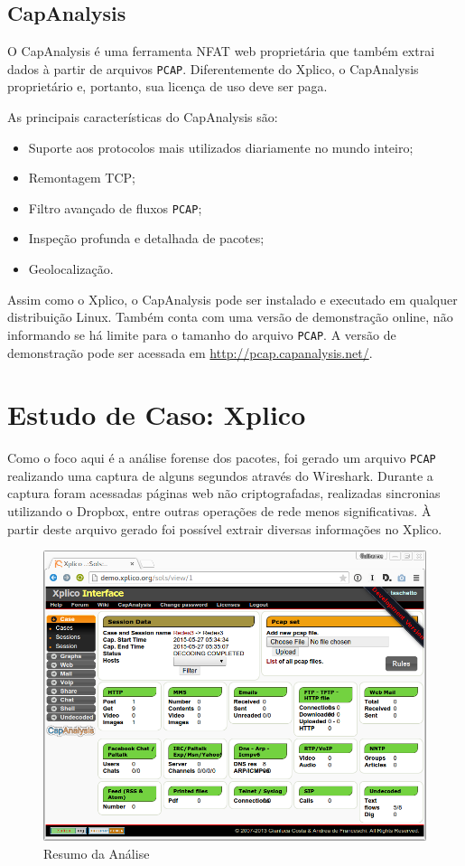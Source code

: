 \documentclass[12pt]{article}
\begin{document}
\subsection{CapAnalysis}

O CapAnalysis é uma ferramenta NFAT web proprietária que também extrai dados à partir de arquivos \texttt{PCAP}. Diferentemente do Xplico, o CapAnalysis proprietário e, portanto, sua licença de uso deve ser paga.

As principais características do CapAnalysis são:

\begin{itemize}
  \item Suporte aos protocolos mais utilizados diariamente no mundo inteiro;
  \item Remontagem TCP;
  \item Filtro avançado de fluxos \texttt{PCAP};
  \item Inspeção profunda e detalhada de pacotes;
  \item Geolocalização.
\end{itemize}

Assim como o Xplico, o CapAnalysis pode ser instalado e executado em qualquer distribuição Linux. Também conta com uma versão de demonstração online, não informando se há limite para o tamanho do arquivo \texttt{PCAP}. A versão de demonstração pode ser acessada em \href{http://pcap.capanalysis.net/}{http://pcap.capanalysis.net/}.

\section{Estudo de Caso: Xplico}

Como o foco aqui é a análise forense dos pacotes, foi gerado um arquivo \texttt{PCAP} realizando uma captura de alguns segundos através do Wireshark. Durante a captura foram acessadas páginas web não criptografadas, realizadas sincronias utilizando o Dropbox, entre outras operações de rede menos significativas. À partir deste arquivo gerado foi possível extrair diversas informações no Xplico.

\begin{figure}[ht]
    \centering
    \includegraphics[scale=0.4]{img/2.png}
    \caption{Resumo da Análise}
    \label{fig:report}
\end{figure}
\end{document}
